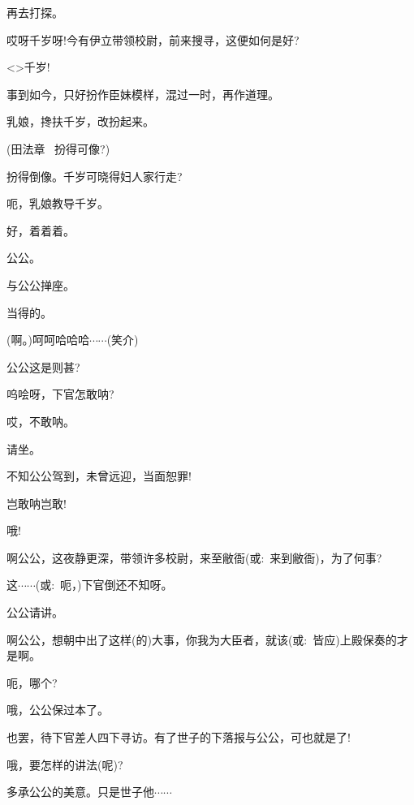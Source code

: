 {再去打探。

哎呀千岁呀!今有伊立带领校尉，前来搜寻，这便如何是好?

\textless{}\!\textgreater{}千岁!

事到如今，只好扮作臣妹模样，混过一时，再作道理。

乳娘，搀扶千岁，改扮起来。





(田法章\hspace{20pt}~ 扮得可像?)

扮得倒像。千岁可晓得妇人家行走?

呃，乳娘教导千岁。

好，着着着。

公公。

与公公掸座。

当得的。

(啊。)呵呵哈哈哈$\cdots{}\cdots{}$({\hwfs 笑介})

公公这是则甚?

呜哙呀，下官怎敢呐?

哎，不敢呐。

请坐。

不知公公驾到，未曾远迎，当面恕罪!

岂敢呐岂敢!

哦!

啊公公，这夜静更深，带领许多校尉，来至敝衙({\akai 或}:~来到敝衙)，为了何事?

这$\cdots{}\cdots{}$({\akai 或}:~呃，)下官倒还不知呀。

公公请讲。

啊公公，想朝中出了这样(的)大事，你我为大臣者，就该({\akai 或}:~皆应)上殿保奏的才是啊。

呃，哪个?

哦，公公保过本了。

也罢，待下官差人四下寻访。有了世子的下落报与公公，可也就是了!

哦，要怎样的讲法(呢)?

多承公公的美意。只是世子他$\cdots{}\cdots{}$

}
